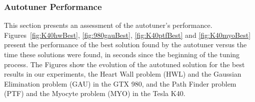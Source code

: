 \subsubsection{Autotuner Performance}

This section presents an assessment of the autotuner's performance.
Figures~\ref{fig:K40hwBest}, \ref{fig:980gauBest}, \ref{fig:K40ptfBest} and
\ref{fig:K40myoBest} present the performance of the best solution found by the
autotuner versus the time these solutions were found, in seconds since the
beginning of the tuning process. The Figures show the evolution of the
autotuned solution for the best results in our experiments, the Heart Wall
problem (HWL) and the Gaussian Elimination problem (GAU) in the GTX 980, and
the Path Finder problem (PTF) and the Myocyte problem (MYO) in the Tesla K40.

